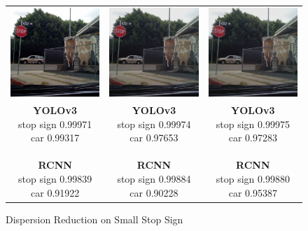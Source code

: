 \documentclass{article}
\begin{document}
\begin{figure}[h]
\centering
    \begin{tabular}{c c c}
        \includegraphics[width=0.3\linewidth]{../test_images/stop3.png} & \includegraphics[width=0.3\linewidth]{../test_images/dispersion_reduced/stop3_25.png} & \includegraphics[width=0.3\linewidth]{../test_images/dispersion_reduced/stop3_50.png} \\

        \makecell[t]{\textbf{YOLOv3} \\ stop sign 0.99971 \\ car 0.99317 \\ \\ \textbf{RCNN} \\ stop sign 0.99839 \\ car 0.91922 \\} & \makecell[t]{\textbf{YOLOv3} \\ stop sign 0.99974 \\ car 0.97653 \\ \\ \textbf{RCNN} \\ stop sign 0.99884 \\ car 0.90228} & \makecell[t]{\textbf{YOLOv3} \\ stop sign 0.99975 \\ car 0.97283 \\ \\ \textbf{RCNN} \\ stop sign 0.99880 \\ car 0.95387}
\end{tabular}
\caption{Dispersion Reduction on Small Stop Sign}
\label{fig:stop3}
\end{figure}
\end{document}
